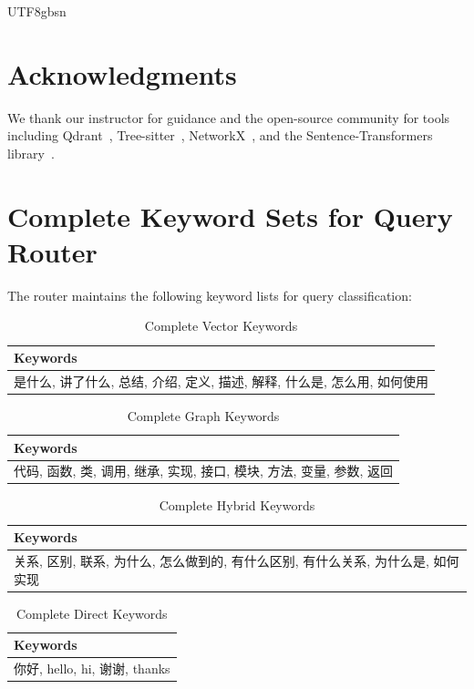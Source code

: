 \documentclass[11pt]{article}
\begin{document}
\begin{CJK*}{UTF8}{gbsn}
\section{Acknowledgments}
We thank our instructor for guidance and the open-source community for tools including Qdrant~\cite{qdrant2024}, Tree-sitter~\cite{trecs2024}, NetworkX~\cite{networkx2024}, and the Sentence-Transformers library~\cite{sentencetransformers2023}.




\appendix
\section{Complete Keyword Sets for Query Router}

The router maintains the following keyword lists for query classification:

\begin{table}[htbp]
\centering
\caption{Complete Vector Keywords}
\begin{tabular}{l}
\toprule
Keywords \\
\midrule
是什么, 讲了什么, 总结, 介绍, 定义, 描述, 解释, 什么是, 怎么用, 如何使用 \\
\bottomrule
\end{tabular}
\end{table}

\begin{table}[htbp]
\centering
\caption{Complete Graph Keywords}
\begin{tabular}{l}
\toprule
Keywords \\
\midrule
代码, 函数, 类, 调用, 继承, 实现, 接口, 模块, 方法, 变量, 参数, 返回 \\
\bottomrule
\end{tabular}
\end{table}

\begin{table}[htbp]
\centering
\caption{Complete Hybrid Keywords}
\begin{tabular}{l}
\toprule
Keywords \\
\midrule
关系, 区别, 联系, 为什么, 怎么做到的, 有什么区别, 有什么关系, 为什么是, 如何实现 \\
\bottomrule
\end{tabular}
\end{table}

\begin{table}[htbp]
\centering
\caption{Complete Direct Keywords}
\begin{tabular}{l}
\toprule
Keywords \\
\midrule
你好, hello, hi, 谢谢, thanks \\
\bottomrule
\end{tabular}
\end{table}

\end{CJK*}
\end{document}
